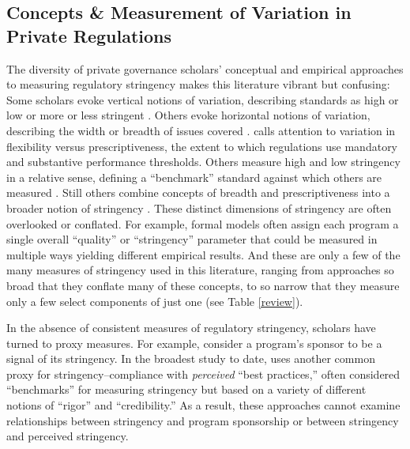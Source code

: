 \documentclass[
      12pt,
            Review ]{article}
\begin{document}
\hypertarget{concepts-measurement-of-variation-in-private-regulations}{%
\subsection{Concepts \& Measurement of Variation in Private Regulations}\label{concepts-measurement-of-variation-in-private-regulations}}

The diversity of private governance scholars' conceptual and empirical approaches to measuring regulatory stringency makes this literature vibrant but confusing: Some scholars evoke vertical notions of variation, describing standards as high or low or more or less stringent \citep{Fischer2014, Li2015}. Others evoke horizontal notions of variation, describing the width or breadth of issues covered \citep{Auld2014, Heyes2017}. \citet{Cashore1997} calls attention to variation in flexibility versus prescriptiveness, the extent to which regulations use mandatory and substantive performance thresholds. Others measure high and low stringency in a relative sense, defining a ``benchmark'' standard against which others are measured \citep{Overdevest2005, Overdevest2010}. Still others combine concepts of breadth and prescriptiveness into a broader notion of stringency \citep{Fransen2011}. These distinct dimensions of stringency are often overlooked or conflated. For example, formal models often assign each program a single overall ``quality'' or ``stringency'' parameter that could be measured in multiple ways yielding different empirical results. And these are only a few of the many measures of stringency used in this literature, ranging from approaches so broad that they conflate many of these concepts, to so narrow that they measure only a few select components of just one (see Table \ref{review}).



In the absence of consistent measures of regulatory stringency, scholars have turned to proxy measures. For example, \citet{Darnall2010} consider a program's sponsor to be a signal of its stringency. In the broadest study to date, \citet{VanderVen2015} uses another common proxy for stringency--compliance with \emph{perceived} ``best practices,'' often considered ``benchmarks'' for measuring stringency but based on a variety of different notions of ``rigor'' and ``credibility.'' As a result, these approaches cannot examine relationships between stringency and program sponsorship or between stringency and perceived stringency.
\end{document}
